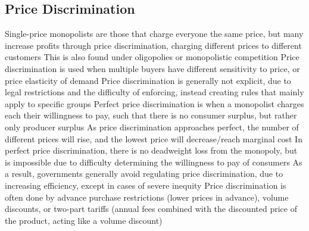 \documentclass[11 pt, twoside]{article}
\newenvironment{outline*}
{
	\begin{outline}[enumerate]
	}
	{\end{outline}
}
\begin{document}
\subsection{Price Discrimination}
\begin{outline*}
\1 Single-price monopolists are those that charge everyone the same price, but many increase profits through price discrimination, charging different prices to different customers
\2 This is also found under oligopolies or monopolistic competition
\2 Price discrimination is used when multiple buyers have different sensitivity to price, or price elasticity of demand
\2 Price discrimination is generally not explicit, due to legal restrictions and the difficulty of enforcing, instead creating rules that mainly apply to specific groups
\1 Perfect price discrimination is when a monopolist charges each their willingness to pay, such that there is no consumer surplus, but rather only producer surplus
\2 As price discrimination approaches perfect, the number of different prices will rise, and the lowest price will decrease/reach marginal cost
\2 In perfect price discrimination, there is no deadweight loss from the monopoly, but is impossible due to difficulty determining the willingness to pay of consumers
\2 As a result, governments generally avoid regulating price discrimination, due to increasing efficiency, except in cases of severe inequity
\1 Price discrimination is often done by advance purchase restrictions (lower prices in advance), volume discounts, or two-part tariffs (annual fees combined with the discounted price of the product, acting like a volume discount)
\end{outline*}
\end{document}
